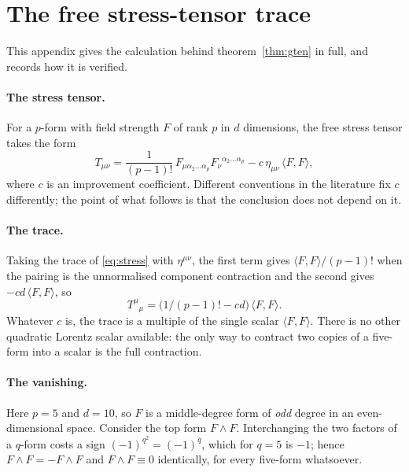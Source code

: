 \section{The free stress-tensor trace}
\label{app:gten}

This appendix gives the calculation behind theorem~\ref{thm:gten} in full, and
records how it is verified.

\paragraph{The stress tensor.}
For a $p$-form with field strength $F$ of rank $p$ in $d$ dimensions, the free
stress tensor takes the form
\begin{equation}
T_{\mu\nu}
 = \frac{1}{(p-1)!}\,F_{\mu\alpha_2\dots\alpha_p}
   F_\nu{}^{\alpha_2\dots\alpha_p}
 - c\,\eta_{\mu\nu}\,\langle F,F\rangle,
\label{eq:stress}
\end{equation}
where $c$ is an improvement coefficient. Different conventions in the literature
fix $c$ differently; the point of what follows is that the conclusion does not
depend on it.

\paragraph{The trace.}
Taking the trace of \eqref{eq:stress} with $\eta^{\mu\nu}$, the first term gives
$\langle F,F\rangle/(p-1)!$ when the pairing is the unnormalised
component contraction and the second gives
$-cd\,\langle F,F\rangle$, so
\begin{equation}
T^\mu{}_\mu = \bigl(1/(p-1)! - cd\bigr)\,\langle F,F\rangle .
\label{eq:trace}
\end{equation}
Whatever $c$ is, the trace is a multiple of the single scalar
$\langle F,F\rangle$. There is no other quadratic Lorentz scalar available: the
only way to contract two copies of a five-form into a scalar is the full
contraction.

\paragraph{The vanishing.}
Here $p = 5$ and $d = 10$, so $F$ is a middle-degree form of \emph{odd} degree in
an even-dimensional space. Consider the top form $F \wedge F$. Interchanging the
two factors of a $q$-form costs a sign $(-1)^{q^2} = (-1)^q$, which for $q = 5$
is $-1$; hence $F\wedge F = -F\wedge F$ and $F \wedge F \equiv 0$ identically,
for every five-form whatsoever.

